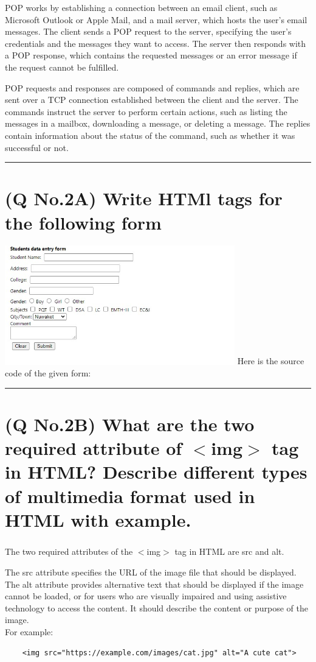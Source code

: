 \documentclass[11pt]{article}
\begin{document}
\begin{enumerate}
    POP works by establishing a connection between an email client, such as Microsoft Outlook or Apple Mail, and a mail server, which hosts the user's email messages. The client sends a POP request to the server, specifying the user's credentials and the messages they want to access. The server then responds with a POP response, which contains the requested messages or an error message if the request cannot be fulfilled.
    
    POP requests and responses are composed of commands and replies, which are sent over a TCP connection established between the client and the server. The commands instruct the server to perform certain actions, such as listing the messages in a mailbox, downloading a message, or deleting a message. The replies contain information about the status of the command, such as whether it was successful or not.
\end{enumerate}

\noindent\rule{\linewidth}{0.4pt}
\section{(Q No.2A) Write HTMl tags for the following form}
\includegraphics[width=0.75\textwidth]{resources/qno2a.jpg}
Here is the source code of the given form:


\noindent\rule{\linewidth}{0.4pt}
\section{(Q No.2B) What are the two required attribute of $<$img$>$ tag in HTML? Describe different types of multimedia format used in HTML with example.}
\subparagraph{}
The two required attributes of the $<$img$>$ tag in HTML are src and alt.

The src attribute specifies the URL of the image file that should be displayed. \\
The alt attribute provides alternative text that should be displayed if the image cannot be loaded, or for users who are visually impaired and using assistive technology to access the content. It should describe the content or purpose of the image. \\
For example:
\begin{lstlisting}
    <img src="https://example.com/images/cat.jpg" alt="A cute cat">
\end{lstlisting}
\end{document}
